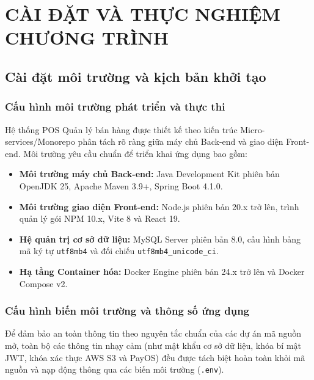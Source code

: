 \chapter{CÀI ĐẶT VÀ THỰC NGHIỆM CHƯƠNG TRÌNH}
\label{chap:cai_dat_thuc_nghiem}

\section{Cài đặt môi trường và kịch bản khởi tạo}
\label{sec:cai_dat_moi_truong}

\subsection{Cấu hình môi trường phát triển và thực thi}
Hệ thống POS Quản lý bán hàng được thiết kế theo kiến trúc Micro-services/Monorepo phân tách rõ ràng giữa máy chủ Back-end và giao diện Front-end. Môi trường yêu cầu chuẩn để triển khai ứng dụng bao gồm:
\begin{itemize}[leftmargin=1.5cm]
    \item \textbf{Môi trường máy chủ Back-end:} Java Development Kit phiên bản OpenJDK 25, Apache Maven 3.9+, Spring Boot 4.1.0.
    \item \textbf{Môi trường giao diện Front-end:} Node.js phiên bản 20.x trở lên, trình quản lý gói NPM 10.x, Vite 8 và React 19.
    \item \textbf{Hệ quản trị cơ sở dữ liệu:} MySQL Server phiên bản 8.0, cấu hình bảng mã ký tự \texttt{utf8mb4} và đối chiếu \texttt{utf8mb4\_unicode\_ci}.
    \item \textbf{Hạ tầng Container hóa:} Docker Engine phiên bản 24.x trở lên và Docker Compose v2.
\end{itemize}

\subsection{Cấu hình biến môi trường và thông số ứng dụng}
Để đảm bảo an toàn thông tin theo nguyên tắc chuẩn của các dự án mã nguồn mở, toàn bộ các thông tin nhạy cảm (như mật khẩu cơ sở dữ liệu, khóa bí mật JWT, khóa xác thực AWS S3 và PayOS) đều được tách biệt hoàn toàn khỏi mã nguồn và nạp động thông qua các biến môi trường (\texttt{.env}).

